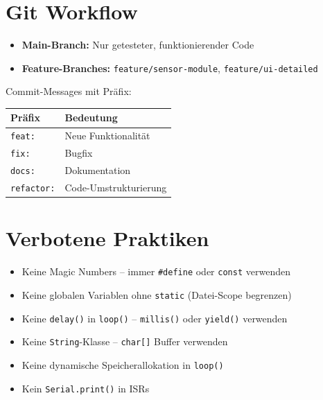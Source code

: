 \documentclass[a4paper,11pt]{article}
\begin{document}
\section{Git Workflow}

\begin{itemize}[leftmargin=2em]
    \item \textbf{Main-Branch:} Nur getesteter, funktionierender Code
    \item \textbf{Feature-Branches:} \texttt{feature/sensor-module}, \texttt{feature/ui-detailed}
\end{itemize}

Commit-Messages mit Präfix:

\begin{longtable}{p{3cm} p{10cm}}
\toprule
\rowcolor{tableheader}
\textbf{Präfix} & \textbf{Bedeutung} \\
\midrule
\endhead
\texttt{feat:}     & Neue Funktionalität \\
\texttt{fix:}      & Bugfix \\
\texttt{docs:}     & Dokumentation \\
\texttt{refactor:} & Code-Umstrukturierung \\
\bottomrule
\end{longtable}

\section{Verbotene Praktiken}

\begin{itemize}[leftmargin=2em]
    \item[\textcolor{red}{\textbf{X}}] Keine Magic Numbers -- immer \texttt{\#define} oder \texttt{const} verwenden
    \item[\textcolor{red}{\textbf{X}}] Keine globalen Variablen ohne \texttt{static} (Datei-Scope begrenzen)
    \item[\textcolor{red}{\textbf{X}}] Keine \texttt{delay()} in \texttt{loop()} -- \texttt{millis()} oder \texttt{yield()} verwenden
    \item[\textcolor{red}{\textbf{X}}] Keine \texttt{String}-Klasse -- \texttt{char[]} Buffer verwenden
    \item[\textcolor{red}{\textbf{X}}] Keine dynamische Speicherallokation in \texttt{loop()}
    \item[\textcolor{red}{\textbf{X}}] Kein \texttt{Serial.print()} in ISRs
\end{itemize}
\end{document}
